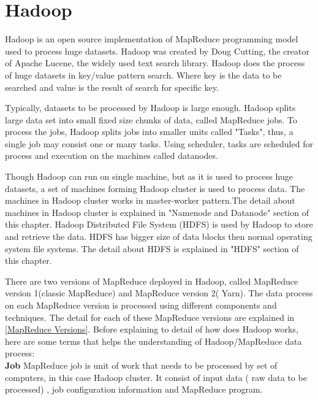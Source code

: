 \section{Hadoop}

Hadoop is an open source implementation of MapReduce programming model used to process huge datasets. Hadoop was created by Doug Cutting, the creator of Apache Lucene, the widely used text search library\cite{tom3}. Hadoop does the process of huge datasets in key/value pattern search. Where key is the data to be searched and value is the result of search for specific key. 

 Typically, datasets to be processed by Hadoop is large enough. Hadoop splits large data set into small fixed size chunks of data, called MapReduce jobs. To process the jobs, Hadoop splits jobs into smaller units called "Tasks", thus, a single job may consist one or many tasks. Using scheduler, tasks are scheduled for process and execution on the machines called datanodes. 
 
 Though Hadoop can run on single machine, but as it is used to process huge datasets, a set of machines forming Hadoop cluster is used to process data. The machines in Hadoop cluster works in master-worker pattern.The detail about machines in Hadoop cluster is explained in "Namenode and Datanode" section of this chapter. Hadoop Distributed File System (HDFS) is used by Hadoop to store and retrieve the data. HDFS has bigger size of data blocks then normal operating system file systems. The detail about HDFS‌ is explained in "HDFS" section of this chapter.   

There are two versions of MapReduce deployed in Hadoop, called MapReduce version 1(classic MapReduce) and MapReduce version 2( Yarn). The data process on each MapReduce version is processed using different components and techniques. The detail for each of these MapReduce versions are explained in \ref{MapReduce Versions}. Before explaining to detail of how does Hadoop works, here are some terms that helps the understanding of Hadoop/MapReduce data process: \\

\textbf{Job} MapReduce job is unit of work that needs to be processed by set of computers, in this case Hadoop cluster. It consist of input data ( raw data to be processed) , job configuration information and MapReduce program. 


